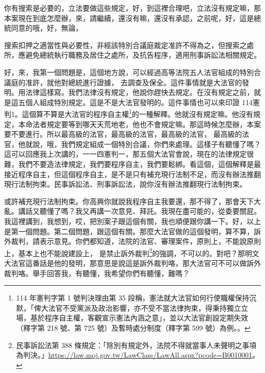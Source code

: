 \hypertarget{c11:cue:182}{}你有搜索是必要的，立法要做這些規定，好，到這裡合理吧，立法沒有規定嘛，那本案現在到底怎麼辦，來，請繼續，還沒有嘛，還沒有承認，之前呢，好，這是總統同意的哦，好，無論，

\hypertarget{c11:cue:183}{}搜索扣押之適當性與必要性，非經該特別合議庭裁定准許不得為之，但搜索之處所，應避免總統執行職務及居住之處所，及抗告程序，適用刑事訴訟法相關規定。\par{}好，來，我第一個問題是，這個地方說，可以經過高等法院五人法官組成的特別合議庭的准許，就他對總統進行證據，
\hypertarget{c11:cue:184}{}去調查及保全。這件事情就是大法官的發明。用法律這樣寫。我們法律沒有規定，他說你趕快去規定。在沒有規定之前，就是這五個人組成特別規定。這是不是大法官發明的。這件事情也可以來印證 114憲判1。這個算不算是大法官的程序自主權\footnote{114 年憲判字第 1 號判決理由第 35 段稱，憲法就大法官如何行使職權保持沉默，「俾大法官不受黨派及政治影響，亦不受不當法律拘束，得秉持獨立立場，基於程序自主權，客觀宣示憲法內涵之意」，並以大法官創設定期失效（釋字第 218 號、第 725 號）及暫時處分制度（釋字第 599 號）為例。\cite{ccj114-1}。}的一種解釋。他就沒有規定嘛。他沒有規定，本命法者規定要等到哪天天荒地老，他也不會規定嘛。那這時候怎麼辦，本案要不要進行。所以最高級的法官，最高級的法官，最高級的法官，
\hypertarget{c11:cue:185}{}最高級的法官，他就說，哦，我們規定組成一個特別合議，你們來處理。這樣子有聽懂了嗎？這可以回應我上次講的，一一四憲判一，那五個大法官會說，現在的法律規定很難，我們不要造法律規定，我們要程序自主，我們要鬆綁。看這個，這個解釋是最接近程序自主，但這個程序自主，是不是只有補充現行法制不足，而沒有辦法推翻現行法制拘束。民事訴訟法、刑事訴訟法，說你沒有辦法推翻現行法制拘束。

\hypertarget{c11:cue:186}{}或許補充現行法制拘束。你高興你就說我程序自主我要還，那不得了，那會天下大亂。講話又聽懂了嗎？我又再講一次意見、拜託。我現在盡可能的，從委要關屁。我這裡講到，我想到，哎，把別案子跟這個有關，我也順便跟你講一下。好，以上是第一個問題。第二個問題，跟這個有關。那麼大法官做的這個發明，算不算，訴外裁判，請表示意見。你們都知道，法院的法官、審理案件，原則上，不能說原則上，基本上也不能說建設上，
\hypertarget{c11:cue:187}{}是禁止訴外裁判\footnote{民事訴訟法第 388 條規定：「除別有規定外，法院不得就當事人未聲明之事項為判決。」\url{https://law.moj.gov.tw/LawClass/LawAll.aspx?pcode=B0010001}。}的強調，不可以的。對吧？那明文大法官這番話是他的發明，那意思是說這是訴外裁判咯，那大法官可不可以做訴外裁判咯。舉手回答我，有聽懂，我希望你們有聽懂，難嗎？

